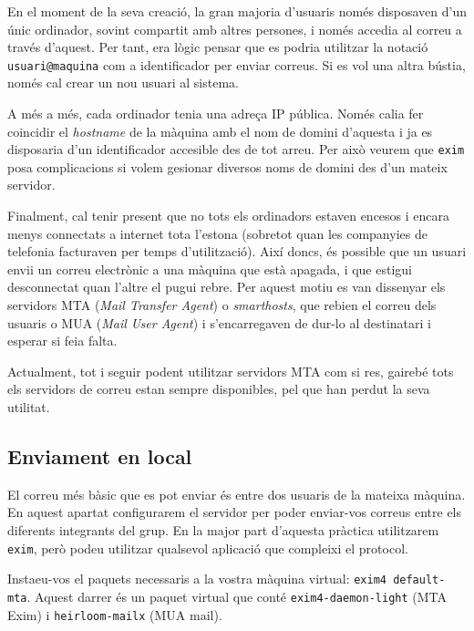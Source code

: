 \documentclass{practicaitic}
\begin{document}
En el moment de la seva creació, la gran majoria d'usuaris només disposaven
d'un únic ordinador, sovint compartit amb altres persones, i només accedia
al correu a través d'aquest. Per tant, era lògic pensar que es podria
utilitzar la notació \texttt{usuari@maquina} com a identificador
per enviar correus. Si es vol una altra bústia, només cal crear un
nou usuari al sistema.

A més a més, cada ordinador tenia una adreça IP pública. Només calia
fer coincidir el \textit{hostname} de la màquina amb el nom de domini
d'aquesta i ja es disposaria d'un identificador accesible des de tot
arreu. Per això veurem que \texttt{exim} posa complicacions si volem
gesionar diversos noms de domini des d'un mateix servidor.

Finalment, cal tenir present que no tots els ordinadors estaven
encesos i encara menys connectats a internet tota l'estona (sobretot
quan les companyies de telefonia facturaven per temps d'utilització).
Així doncs, és possible que un usuari envii un correu electrònic a
una màquina que està apagada, i que estigui desconnectat quan l'altre
el pugui rebre. Per aquest motiu es van dissenyar els servidors MTA
(\textit{Mail Transfer Agent}) o \textit{smarthosts}, que rebien el
correu dels usuaris o MUA (\textit{Mail User Agent}) i s'encarregaven
de dur-lo al destinatari i esperar si feia falta.

Actualment, tot i seguir podent utilitzar servidors MTA com si res,
gairebé tots els servidors de correu estan sempre disponibles, pel
que han perdut la seva utilitat.

\subsection{Enviament en local}

El correu més bàsic que es pot enviar és entre dos usuaris de la
mateixa màquina. En aquest apartat configurarem el servidor
per poder enviar-vos correus entre els diferents integrants
del grup. En la major part d'aquesta pràctica utilitzarem \texttt{exim},
però podeu utilitzar qualsevol aplicació que compleixi el protocol.

\begin{previ}
  Insta\lgem eu-vos el paquets necessaris a la vostra màquina virtual:
  \texttt{exim4 default-mta}. Aquest darrer és un paquet virtual que
  conté \texttt{exim4-daemon-light} (MTA Exim) i \texttt{heirloom-mailx}
  (MUA mail).
\end{previ}
\end{document}
